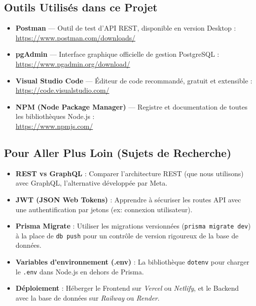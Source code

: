 \subsection*{Outils Utilisés dans ce Projet}
\begin{itemize}
    \item \textbf{Postman} --- Outil de test d'API REST, disponible en version Desktop :\\
    \href{https://www.postman.com/downloads/}{https://www.postman.com/downloads/}

    \item \textbf{pgAdmin} --- Interface graphique officielle de gestion PostgreSQL :\\
    \href{https://www.pgadmin.org/download/}{https://www.pgadmin.org/download/}

    \item \textbf{Visual Studio Code} --- Éditeur de code recommandé, gratuit et extensible :\\
    \href{https://code.visualstudio.com/}{https://code.visualstudio.com/}

    \item \textbf{NPM (Node Package Manager)} --- Registre et documentation de toutes les bibliothèques Node.js :\\
    \href{https://www.npmjs.com/}{https://www.npmjs.com/}
\end{itemize}

\subsection*{Pour Aller Plus Loin (Sujets de Recherche)}
\begin{itemize}
    \item \textbf{REST vs GraphQL} : Comparer l'architecture REST (que nous utilisons) avec GraphQL, l'alternative développée par Meta.
    \item \textbf{JWT (JSON Web Tokens)} : Apprendre à sécuriser les routes API avec une authentification par jetons (ex: connexion utilisateur).
    \item \textbf{Prisma Migrate} : Utiliser les migrations versionnées (\texttt{prisma migrate dev}) à la place de \texttt{db push} pour un contrôle de version rigoureux de la base de données.
    \item \textbf{Variables d'environnement (.env)} : La bibliothèque \texttt{dotenv} pour charger le \texttt{.env} dans Node.js en dehors de Prisma.
    \item \textbf{Déploiement} : Héberger le Frontend sur \textit{Vercel} ou \textit{Netlify}, et le Backend avec la base de données sur \textit{Railway} ou \textit{Render}.
\end{itemize}

